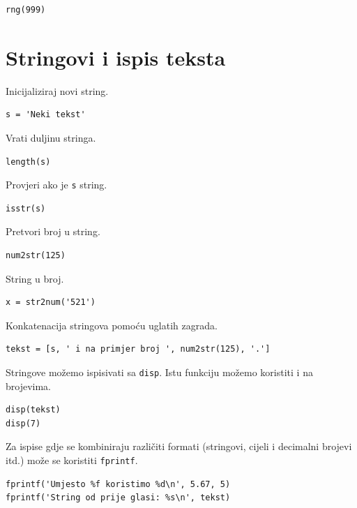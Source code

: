 \documentclass[a4paper, 10pt]{article}
\newcommand{\spec}[1]{\texttt{#1}} %
\begin{document}
\begin{lstlisting}
rng(999)
\end{lstlisting}


\section{Stringovi i ispis teksta}

Inicijaliziraj novi string.

\begin{lstlisting}
s = 'Neki tekst'
\end{lstlisting}

Vrati duljinu stringa.

\begin{lstlisting}
length(s)
\end{lstlisting}

Provjeri ako je \spec{s} string.

\begin{lstlisting}
isstr(s)
\end{lstlisting}

Pretvori broj u string.

\begin{lstlisting}
num2str(125)
\end{lstlisting}

String u broj.

\begin{lstlisting}
x = str2num('521')
\end{lstlisting}

Konkatenacija stringova pomoću uglatih zagrada.

\begin{lstlisting}
tekst = [s, ' i na primjer broj ', num2str(125), '.']
\end{lstlisting}

Stringove možemo ispisivati sa \spec{disp}.
Istu funkciju možemo koristiti i na brojevima.

\begin{lstlisting}
disp(tekst)
disp(7)
\end{lstlisting}

Za ispise gdje se kombiniraju različiti formati (stringovi, cijeli i decimalni brojevi itd.) može se koristiti \spec{fprintf}.

\begin{lstlisting}
fprintf('Umjesto %f koristimo %d\n', 5.67, 5)
fprintf('String od prije glasi: %s\n', tekst)
\end{lstlisting}
\end{document}
